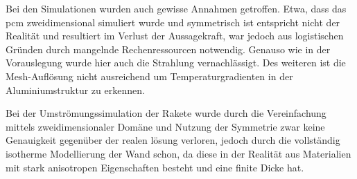 Bei den Simulationen wurden auch gewisse Annahmen getroffen. Etwa, dass das \ac{pcm} zweidimensional simuliert wurde und symmetrisch ist entspricht
nicht der Realität und resultiert im Verlust der Aussagekraft, war jedoch aus logistischen Gründen durch mangelnde Rechenressourcen notwendig.
Genauso wie in der Vorauslegung wurde hier auch die Strahlung vernachlässigt. Des weiteren ist die Mesh-Auflösung nicht ausreichend um
Temperaturgradienten in der Aluminiumstruktur zu erkennen.

Bei der Umströmungssimulation der Rakete wurde durch die Vereinfachung mittels zweidimensionaler Domäne und Nutzung der Symmetrie zwar keine
Genauigkeit gegenüber der realen lösung verloren, jedoch durch die vollständig isotherme Modellierung der Wand schon, da diese in der
Realität aus Materialien mit stark anisotropen Eigenschaften besteht und eine finite Dicke hat.